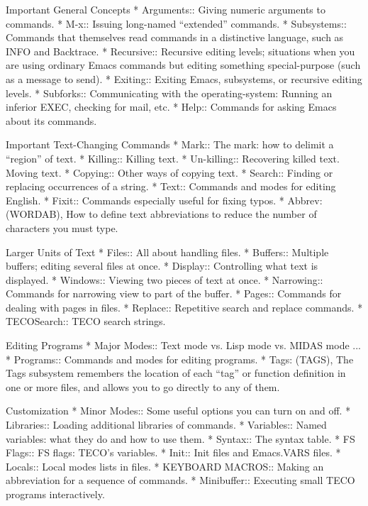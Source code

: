 Important General Concepts
* Arguments::   Giving numeric arguments to commands.
* M-x::         Issuing long-named ``extended'' commands.
* Subsystems::  Commands that themselves read commands in a distinctive
                language, such as INFO and Backtrace.
* Recursive::   Recursive editing levels; situations when you are
                using ordinary Emacs commands but editing something
                special-purpose (such as a message to send).
* Exiting::     Exiting Emacs, subsystems, or recursive editing levels.
* Subforks::    Communicating with the operating-system:
                Running an inferior EXEC, checking for mail, etc.
* Help::        Commands for asking Emacs about its commands.

Important Text-Changing Commands
* Mark::        The mark: how to delimit a ``region'' of text.
* Killing::     Killing text.
* Un-killing::  Recovering killed text.  Moving text.
* Copying::     Other ways of copying text.
* Search::      Finding or replacing occurrences of a string.
* Text::        Commands and modes for editing English.
* Fixit::       Commands especially useful for fixing typos.
* Abbrev: (WORDAB),     How to define text abbreviations to reduce
                        the number of characters you must type.

Larger Units of Text
* Files::       All about handling files.
* Buffers::     Multiple buffers; editing several files at once.
* Display::     Controlling what text is displayed.
* Windows::     Viewing two pieces of text at once.
* Narrowing::   Commands for narrowing view to part of the buffer.
* Pages::       Commands for dealing with pages in files.
* Replace::     Repetitive search and replace commands.
* TECOSearch::  TECO search strings.

Editing Programs
* Major Modes:: Text mode vs. Lisp mode vs. MIDAS mode ...
* Programs::    Commands and modes for editing programs.
* Tags: (TAGS), The Tags subsystem remembers the location of each
                ``tag'' or function definition in one or more files,
                and allows you to go directly to any of them.

Customization
* Minor Modes:: Some useful options you can turn on and off.
* Libraries::   Loading additional libraries of commands.
* Variables::   Named variables:  what they do and how to use them.
* Syntax::      The syntax table.
* FS Flags::    FS flags: TECO's variables.
* Init::        Init files and Emacs.VARS files.
* Locals::      Local modes lists in files.
* KEYBOARD MACROS::      Making an abbreviation for a sequence of commands.
* Minibuffer::  Executing small TECO programs interactively.

